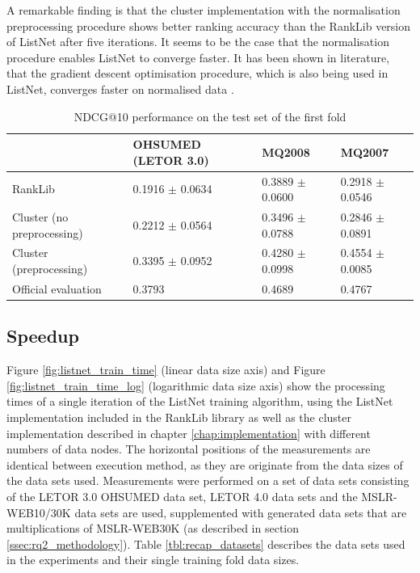 A remarkable finding is that the cluster implementation with the normalisation preprocessing procedure shows better ranking accuracy than the RankLib version of ListNet after five iterations. It seems to be the case that the normalisation procedure enables ListNet to converge faster. It has been shown in literature, that the gradient descent optimisation procedure, which is also being used in ListNet, converges faster on normalised data \cite{Ng1999}.

\begin{table}
\centering
\begin{tabular}{p{3.4cm}p{3.0cm}p{2.6cm}p{2.6cm}}\toprule
 &  OHSUMED  (LETOR 3.0) & MQ2008 & MQ2007 \\
\midrule
RankLib                             & 0.1916 $\pm$ 0.0634 & 0.3889 $\pm$ 0.0600 & 0.2918 $\pm$ 0.0546 \\
Cluster \newline (no preprocessing)	& 0.2212 $\pm$ 0.0564 & 0.3496 $\pm$ 0.0788 & 0.2846 $\pm$ 0.0891\\
Cluster \newline (preprocessing)    & 0.3395 $\pm$ 0.0952 & 0.4280 $\pm$ 0.0998 & 0.4554 $\pm$ 0.0085\\
Official evaluation                 & 0.3793 & 0.4689 & 0.4767 \\
\bottomrule
\end{tabular}
\caption{\acs{NDCG}@10 performance on the test set of the first fold}
\label{tbl:accuracy_comparison}
\end{table}

\subsection{Speedup}
\label{ssec:speedup}
Figure \ref{fig:listnet_train_time} (linear data size axis) and Figure \ref{fig:listnet_train_time_log} (logarithmic data size axis) show the processing times of a single iteration of the ListNet training algorithm, using the ListNet implementation included in the RankLib library as well as the cluster implementation described in chapter \ref{chap:implementation} with different numbers of data nodes. The horizontal positions of the measurements are identical between execution method, as they are originate from the data sizes of the data sets used. Measurements were performed on a set of data sets consisting of the LETOR 3.0 OHSUMED data set, LETOR 4.0 data sets and the MSLR-WEB10/30K data sets are used, supplemented with generated data sets that are multiplications of MSLR-WEB30K (as described in section \ref{ssec:rq2_methodology}). Table \ref{tbl:recap_datasets} describes the data sets used in the experiments and their single training fold data sizes.\\

